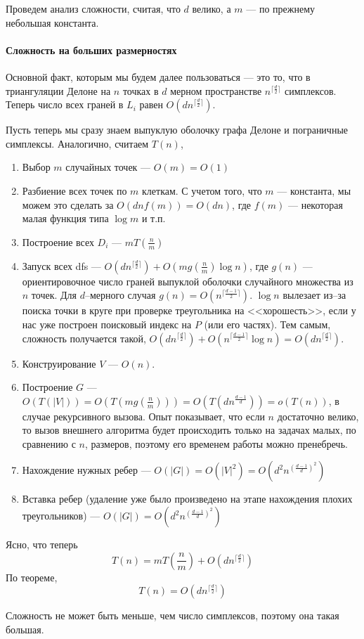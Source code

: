 
    Проведем анализ сложности, считая, что $d$ велико, а $m$ --- по прежнему небольшая константа. 
    
    \paragraph{Сложность на больших размерностях\\}
        Основной факт, которым мы будем далее пользоваться --- это то, что в триангуляции Делоне на $n$ точках в $d$ мерном пространстве $n^{\lceil \frac{d}{2} \rceil}$ симплексов. Теперь число всех граней в $L_i$ равен $O(d n^{\lceil \frac{d}{2} \rceil})$.
    
        Пусть теперь мы сразу знаем выпуклую оболочку графа Делоне и пограничные симплексы. Аналогично, считаем $T(n)$,    
        \begin{enumerate}
            \item Выбор $m$ случайных точек --- $O(m) = O(1)$
            \item Разбиение всех точек по $m$ клеткам. С учетом того, что $m$ --- константа, мы можем это сделать за $O(d n f(m)) = O(d n)$, где $f(m)$ --- некоторая малая функция типа $\log m$ и т.п.
            \item Построение всех $D_i$ --- $m T(\frac{n}{m})$
            \item Запуск всех dfs --- $O(d n^{\lceil \frac{d}{2} \rceil}) + O(m g(\frac{n}{m}) \log n)$, где $g(n)$ --- ориентировочное число граней выпуклой оболочки случайного множества из $n$ точек. Для $d$--мерного случая $g(n) = O(n^{\lceil \frac{d - 1}{2} \rceil})$. $\log n$ вылезает из--за поиска точки в круге при проверке треугольника на <<хорошесть>>, если у нас уже построен поисковый индекс на $P$ (или его частях). Тем самым, сложность получается такой, $O(d n^{\lceil \frac{d}{2} \rceil}) + O(n^{\lceil \frac{d - 1}{2} \rceil} \log n) = O(d n^{\lceil \frac{d}{2} \rceil})$.
            \item Конструирование $V$ --- $O(n)$.
            \item Построение $G$ --- $O(T(|V|)) = O(T(m g\left(\frac{n}{m}\right))) = O(T(d n^\frac{d - 1}{d})) = o(T(n))$, в случае рекурсивного вызова. Опыт показывает, что если $n$ достаточно велико, то вызов внешнего алгоритма будет происходить только на задачах малых, по сравнению с $n$, размеров, поэтому его временем работы можно пренебречь.
            \item Нахождение нужных ребер --- $O(|G|) = O(|V|^2) = O \left( d^2 n^{\left( \frac{d - 1}{d} \right)^2} \right)$
            \item Вставка ребер (удаление уже было произведено на этапе нахождения плохих треугольников) --- $O(|G|) = O\left(d^2 n^{\left( \frac{d - 1}{d} \right)^2} \right)$
    \end{enumerate}  
    
    Ясно, что теперь 
    $$
        T(n) = m T \left( \frac{n}{m} \right) + O(d n^{\lceil \frac{d}{2} \rceil})
    $$      
    По теореме,
    $$
        T(n) = O(d n^{\lceil \frac{d}{2} \rceil})
    $$
    
    Сложность не может быть меньше, чем число симплексов, поэтому она такая большая.